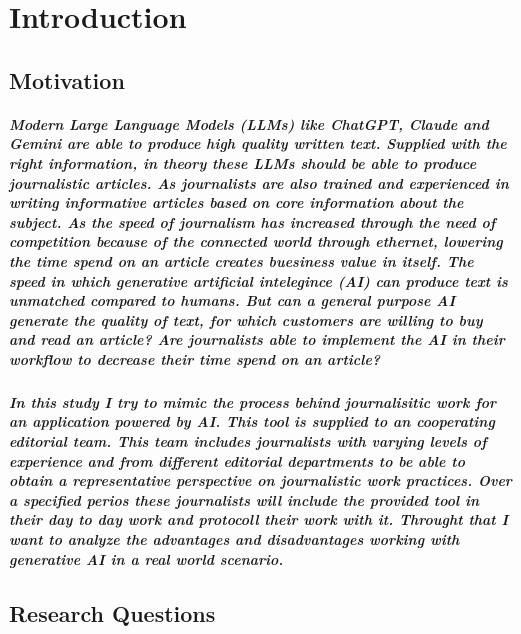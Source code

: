 \chapter{Introduction}
\label{ch:introduction}


\section{Motivation}
\paragraph{
Modern Large Language Models (LLMs) like ChatGPT, Claude and Gemini are able to produce high quality written text. Supplied with the right information, in theory these LLMs should be able to produce journalistic articles. As journalists are also trained and experienced in writing informative articles based on core information about the subject. As the speed of journalism has increased through the need of competition because of the connected world through ethernet, lowering the time spend on an article creates buesiness value in itself. The speed in which generative artificial intelegince (AI) can produce text is unmatched compared to humans. But can a general purpose AI generate the quality of text, for which customers are willing to buy and read an article? Are journalists able to implement the AI in their workflow to decrease their time spend on an article?}
\paragraph{
In this study I try to mimic the process behind journalisitic work for an application powered by AI. This tool is supplied to an cooperating editorial team. This team includes journalists with varying levels of experience and from different editorial departments to be able to obtain a representative perspective on journalistic work practices. Over a specified perios these journalists will include the provided tool in their day to day work and protocoll their work with it. Throught that I want to analyze the advantages and disadvantages working with generative AI in a real world scenario.}

\section{Research Questions}

